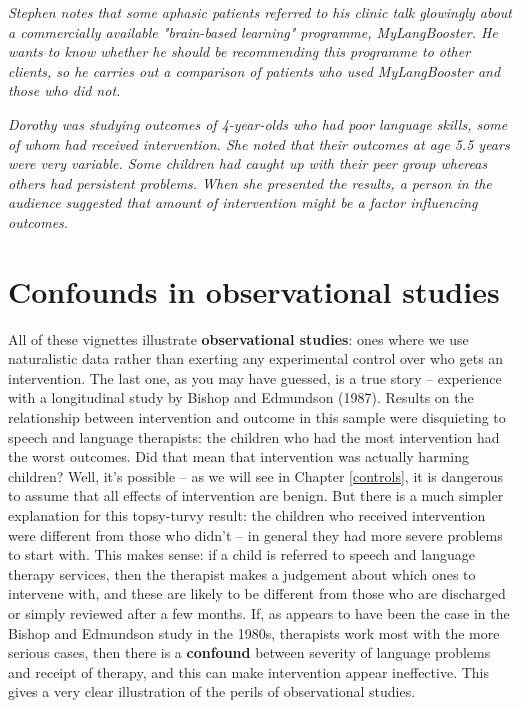 \documentclass{krantz}
\begin{document}
\begin{shaded}
\textit{Stephen notes that some aphasic patients referred to his clinic talk glowingly about a commercially available "brain-based learning" programme, MyLangBooster. He wants to know whether he should be recommending this programme to other clients, so he carries out a comparison of patients who used MyLangBooster and those who did not.}
\end{shaded}

\begin{shaded}
\textit{Dorothy was studying outcomes of 4-year-olds who had poor language skills, some of whom had received intervention. She noted that their outcomes at age 5.5 years were very variable. Some children had caught up with their peer group whereas others had persistent problems. When she presented the results, a person in the audience suggested that amount of intervention might be a factor influencing outcomes.}
\end{shaded}

\hypertarget{confounds-in-observational-studies}{%
\section{Confounds in observational studies}\label{confounds-in-observational-studies}}

All of these vignettes illustrate \textbf{observational studies}: ones where we use naturalistic data rather than exerting any experimental control over who gets an intervention. The last one, as you may have guessed, is a true story -- experience with a longitudinal study by Bishop and Edmundson (1987). Results on the relationship between intervention and outcome in this sample were disquieting to speech and language therapists: the children who had the most intervention had the worst outcomes. Did that mean that intervention was actually harming children? Well, it's possible -- as we will see in Chapter \ref{controls}, it is dangerous to assume that all effects of intervention are benign. But there is a much simpler explanation for this topsy-turvy result: the children who received intervention were different from those who didn't -- in general they had more severe problems to start with. This makes sense: if a child is referred to speech and language therapy services, then the therapist makes a judgement about which ones to intervene with, and these are likely to be different from those who are discharged or simply reviewed after a few months. If, as appears to have been the case in the Bishop and Edmundson study in the 1980s, therapists work most with the more serious cases, then there is a \textbf{confound} between severity of language problems and receipt of therapy, and this can make intervention appear ineffective. This gives a very clear illustration of the perils of observational studies.
\end{document}
